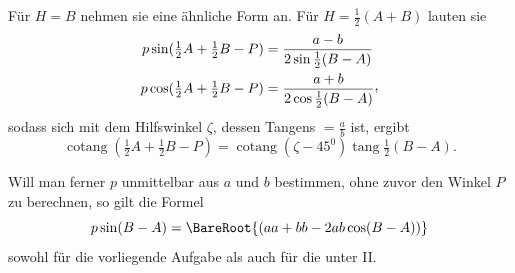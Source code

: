 Für $H=B$ nehmen sie eine ähnliche Form an. Für $H=\tfrac{1}{2}(A+B)$ lauten sie
\[
\begin{aligned}
p\sin(\tfrac{1}{2}A+\tfrac{1}{2}B-P)&=\frac{a-b}{2\sin\tfrac{1}{2}(B-A)}\\
p\cos(\tfrac{1}{2}A+\tfrac{1}{2}B-P)&=\frac{a+b}{2\cos\tfrac{1}{2}(B-A)}\mathpunct{\raisebox{.45ex}{,}}
\end{aligned}
\]
sodass sich mit dem Hilfswinkel $\zeta$, dessen Tangens $=\frac{a}{b}$ ist, ergibt
\[
\operatorname{cotang}(\tfrac{1}{2}A+\tfrac{1}{2}B-P)=\operatorname{cotang}(\zeta-45^0)\operatorname{tang}\tfrac{1}{2}(B-A).
\]
\par
Will man ferner $p$ unmittelbar aus $a$ und $b$ bestimmen, ohne zuvor den Winkel $P$ zu berechnen, so gilt die Formel
\[
p\sin(B-A)=\BareRoot{(aa+bb-2ab\cos(B-A))}
\]
sowohl für die vorliegende Aufgabe als auch für die unter II.
